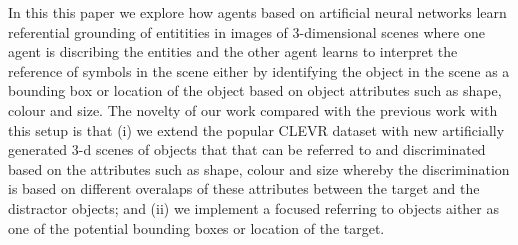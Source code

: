 \documentclass[11pt]{article}
\begin{document}
In this this paper we explore how agents based on artificial neural networks learn referential grounding of entitities in images of 3-dimensional scenes where one agent is discribing the entities and the other agent learns to interpret the reference of symbols in the scene either by identifying the object in the scene as a bounding box or location of the object based on object attributes such as shape, colour and size.
The novelty of our work compared with the previous work with this setup \citep{Kharitonov2019} is that (i) we extend the popular CLEVR dataset \citep{Johnson2016} with new artificially generated 3-d scenes of objects that that can be referred to and discriminated based on the attributes such as shape, colour and size whereby the discrimination is based on different overalaps of these attributes between the target and the distractor objects; and (ii) we implement a focused referring to objects aither as one of the potential bounding boxes or location of the target.



\end{document}

